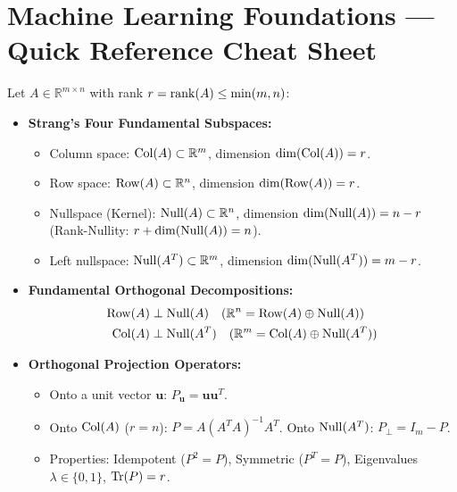 \chapter*{Machine Learning Foundations --- Quick Reference Cheat Sheet}

\begin{tcolorbox}[breakable, colback=primarylight!30, colframe=primarydark, title={\large \textbf{1. Linear Algebra, Subspaces \& Regularized Regression (Weeks 1, 3--4)}}]
Let $A \in \mathbb{R}^{m \times n}$ with rank $r = \operatorname{rank}(A) \le \min(m, n)$:
\begin{itemize}[leftmargin=*, noitemsep, topsep=2pt]
    \item \textbf{Strang's Four Fundamental Subspaces:}
    \begin{itemize}[leftmargin=*, noitemsep]
        \item Column space: $\operatorname{Col}(A) \subset \mathbb{R}^m$, dimension $\dim(\operatorname{Col}(A)) = r$.
        \item Row space: $\operatorname{Row}(A) \subset \mathbb{R}^n$, dimension $\dim(\operatorname{Row}(A)) = r$.
        \item Nullspace (Kernel): $\operatorname{Null}(A) \subset \mathbb{R}^n$, dimension $\dim(\operatorname{Null}(A)) = n - r$ (Rank-Nullity: $r + \dim(\operatorname{Null}(A)) = n$).
        \item Left nullspace: $\operatorname{Null}(A^T) \subset \mathbb{R}^m$, dimension $\dim(\operatorname{Null}(A^T)) = m - r$.
    \end{itemize}
    \item \textbf{Fundamental Orthogonal Decompositions:}
    \begin{align*}
    \operatorname{Row}(A) &\perp \operatorname{Null}(A) \quad (\mathbb{R}^n = \operatorname{Row}(A) \oplus \operatorname{Null}(A)) \\
    \operatorname{Col}(A) &\perp \operatorname{Null}(A^T) \quad (\mathbb{R}^m = \operatorname{Col}(A) \oplus \operatorname{Null}(A^T))
    \end{align*}
    \item \textbf{Orthogonal Projection Operators:}
    \begin{itemize}[leftmargin=*, noitemsep]
        \item Onto a unit vector $\mathbf{u}$: $P_{\mathbf{u}} = \mathbf{u}\mathbf{u}^T$.
        \item Onto $\operatorname{Col}(A)$ ($r = n$): $P = A(A^T A)^{-1}A^T$. Onto $\operatorname{Null}(A^T)$: $P_\perp = I_m - P$.
        \item Properties: Idempotent ($P^2 = P$), Symmetric ($P^T = P$), Eigenvalues $\lambda \in \{0, 1\}$, $\operatorname{Tr}(P) = r$.

\end{itemize}
\end{itemize}
\end{tcolorbox}

